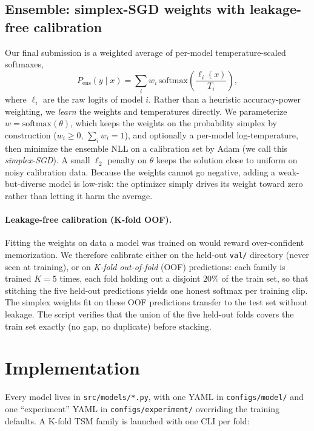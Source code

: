 \documentclass[10pt,twocolumn,letterpaper]{article}
\begin{document}
\subsection{Ensemble: simplex-SGD weights with leakage-free calibration}
\label{sec:ensemble}

Our final submission is a weighted average of per-model
temperature-scaled softmaxes,
\[
P_{\text{ens}}(y\mid x) = \sum_i w_i\,
\text{softmax}\!\left(\frac{\ell_i(x)}{T_i}\right),
\]
where $\ell_i$ are the raw logits of model $i$. Rather than a heuristic
accuracy-power weighting, we \emph{learn} the weights and temperatures
directly. We parameterize $w = \text{softmax}(\theta)$, which keeps the
weights on the probability simplex by construction ($w_i\!\ge\!0$,
$\sum_i w_i\!=\!1$), and optionally a per-model log-temperature, then
minimize the ensemble NLL on a calibration set by Adam (we call this
\emph{simplex-SGD}). A small $\ell_2$ penalty on $\theta$ keeps the
solution close to uniform on noisy calibration data. Because the weights
cannot go negative, adding a weak-but-diverse model is low-risk: the
optimizer simply drives its weight toward zero rather than letting it
harm the average.

\paragraph{Leakage-free calibration (K-fold OOF).} Fitting the weights
on data a model was trained on would reward over-confident memorization.
We therefore calibrate either on the held-out \texttt{val/} directory
(never seen at training), or on \emph{K-fold out-of-fold} (OOF)
predictions: each family is trained $K=5$ times, each fold holding out a
disjoint $20\%$ of the train set, so that stitching the five held-out
predictions yields one honest softmax per training clip. The simplex
weights fit on these OOF predictions transfer to the test set without
leakage. The script verifies that the union of the five held-out folds
covers the train set exactly (no gap, no duplicate) before stacking.

\section{Implementation}

Every model lives in \texttt{src/models/*.py}, with one YAML in
\texttt{configs/model/} and one ``experiment'' YAML in
\texttt{configs/experiment/} overriding the training defaults. A K-fold
TSM family is launched with one CLI per fold:
\end{document}
